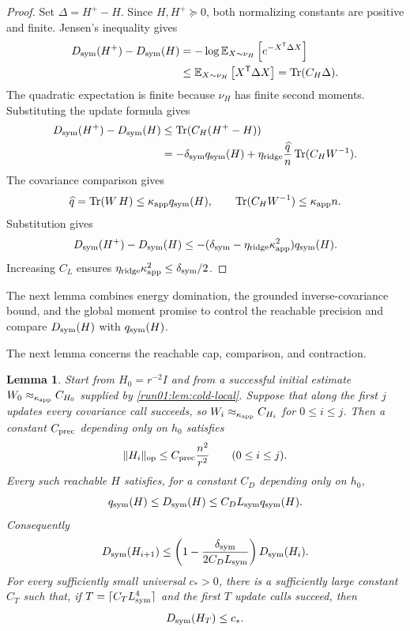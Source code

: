 \documentclass[11pt]{article}
\numberwithin{equation}{section}
\newtheorem{lemma}{Lemma}[section]
\theoremstyle{definition}
\newcommand{\E}[2]{\mathbb{E}_{#1}\left[#2\right]}
\begin{document}
\begin{proof}
Set $\Delta=H^+-H$. Since $H,H^+\succeq0$, both normalizing constants
are positive and finite. Jensen's inequality gives
\[
\begin{aligned}
D_{\rm sym}(H^+)-D_{\rm sym}(H)
&=-\log\E{X\sim\nu_H}{e^{-X^{\mathsf T}\Delta X}}\\
&\leq\E{X\sim\nu_H}{X^{\mathsf T}\Delta X}
=\operatorname{Tr}(C_H\Delta).
\end{aligned}
\]
The quadratic expectation is finite because $\nu_H$ has finite second moments.
Substituting the update formula gives
\[
 \begin{aligned}
 D_{\rm sym}(H^+)-D_{\rm sym}(H)
 &\leq\operatorname{Tr}(C_H(H^+-H))\\
 &=-\delta_{\rm sym}q_{\rm sym}(H)
 +\eta_{\rm ridge}\frac{\widehat q}{n}
  \operatorname{Tr}(C_HW^{-1}).
 \end{aligned}
\]
The covariance comparison gives
\[
\widehat q
=\operatorname{Tr}(W\,H)
\leq\kappa_{\rm app}q_{\rm sym}(H),
\qquad
\operatorname{Tr}(C_HW^{-1})\leq\kappa_{\rm app}n.
\]
Substitution gives
\[
 D_{\rm sym}(H^+)-D_{\rm sym}(H)
 \leq-(\delta_{\rm sym}
 -\eta_{\rm ridge}\kappa_{\rm app}^2)q_{\rm sym}(H).
\]
Increasing $C_L$ ensures
$\eta_{\rm ridge}\kappa_{\rm app}^2\leq\delta_{\rm sym}/2$.
\end{proof}

The next lemma combines energy domination, the grounded inverse-covariance
bound, and the global moment promise to control the reachable precision and
compare $D_{\rm sym}(H)$ with
$q_{\rm sym}(H)$.

The next lemma concerns the reachable cap, comparison, and contraction.

\begin{lemma}
\label{run01:lem:global-progress}
Start from $H_0=r^{-2}I$ and from a successful initial estimate
$W_0\approx_{\kappa_{\rm app}}C_{H_0}$ supplied by \cref{run01:lem:cold-local}.
Suppose that along the first $j$ updates every covariance call succeeds, so
$W_i\approx_{\kappa_{\rm app}}C_{H_i}$ for
$0\leq i\leq j$.
Then a constant $C_{\rm prec}$ depending only on
$h_0$ satisfies
\[
 \|H_i\|_{\mathrm{op}}\leq C_{\rm prec}\frac{n^2}{r^2}
 \qquad(0\leq i\leq j).
\]
Every such reachable $H$ satisfies, for a constant
$C_D$ depending only on
$h_0$,
\[
q_{\rm sym}(H)
\leq D_{\rm sym}(H)
\leq C_DL_{\rm sym}q_{\rm sym}(H).
\]
Consequently
\[
 D_{\rm sym}(H_{i+1})\leq
 \left(1-\frac{\delta_{\rm sym}}{2C_DL_{\rm sym}}\right)
 D_{\rm sym}(H_i).
\]
For every sufficiently small universal $c_*>0$, there is a sufficiently large
constant
$C_T$ such that, if
$T=\lceil C_TL_{\rm sym}^4\rceil$ and the first
$T$ update calls succeed, then
\[
 D_{\rm sym}(H_T)\leq c_*.
\]
\end{lemma}
\end{document}
